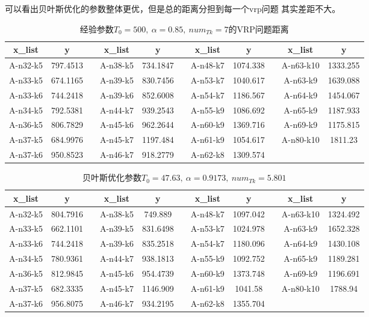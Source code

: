 \documentclass{nudt}
\begin{document}
可以看出贝叶斯优化的参数整体更优，但是总的距离分担到每一个vrp问题
其实差距不大。
\begin{table}[htbp]
	\centering
	\caption{经验参数$T_0=500,\ \alpha=0.85,\ num_{Tk}=7$的VRP问题距离}
	  \begin{tabular}{ccccccccccc}
	  \toprule
	  \textbf{x\_list} & \textbf{y} &     & \textbf{x\_list} & \textbf{y} &     & \textbf{x\_list} & \textbf{y} &     & \textbf{x\_list} & \textbf{y} \\
	  \midrule
	  A-n32-k5 & 797.4513 &     & A-n38-k5 & 734.1847 &     & A-n48-k7 & 1074.338 &     & A-n63-k10 & 1333.255 \\
	  A-n33-k5 & 674.1165 &     & A-n39-k5 & 830.7456 &     & A-n53-k7 & 1040.617 &     & A-n63-k9 & 1639.088 \\
	  A-n33-k6 & 744.2418 &     & A-n39-k6 & 852.6008 &     & A-n54-k7 & 1186.567 &     & A-n64-k9 & 1454.067 \\
	  A-n34-k5 & 792.5381 &     & A-n44-k7 & 939.2543 &     & A-n55-k9 & 1086.692 &     & A-n65-k9 & 1187.933 \\
	  A-n36-k5 & 806.7829 &     & A-n45-k6 & 962.2644 &     & A-n60-k9 & 1369.716 &     & A-n69-k9 & 1175.815 \\
	  A-n37-k5 & 684.9976 &     & A-n45-k7 & 1197.484 &     & A-n61-k9 & 1054.617 &     & A-n80-k10 & 1811.23 \\
	  A-n37-k6 & 950.8523 &     & A-n46-k7 & 918.2779 &     & A-n62-k8 & 1309.574 &     &     &  \\
	  \bottomrule
	  \end{tabular}%
	\label{tab:exp_index}%
  \end{table}%
\begin{table}[htbp]
	\centering
	\caption{贝叶斯优化参数$T_0=47.63,\ \alpha=0.9173,\ num_{Tk}=5.801$}
	  \begin{tabular}{ccccccccccc}
	  \toprule
	  \textbf{x\_list} & \textbf{y} &     & \textbf{x\_list} & \textbf{y} &     & \textbf{x\_list} & \textbf{y} &     & \textbf{x\_list} & \textbf{y} \\
	  \midrule
	  A-n32-k5 & 804.7916 &     & A-n38-k5 & 749.889 &     & A-n48-k7 & 1097.042 &     & A-n63-k10 & 1324.492 \\
	  A-n33-k5 & 662.1101 &     & A-n39-k5 & 831.6498 &     & A-n53-k7 & 1024.978 &     & A-n63-k9 & 1652.328 \\
	  A-n33-k6 & 744.2418 &     & A-n39-k6 & 835.2518 &     & A-n54-k7 & 1180.096 &     & A-n64-k9 & 1430.108 \\
	  A-n34-k5 & 780.9361 &     & A-n44-k7 & 938.1813 &     & A-n55-k9 & 1092.752 &     & A-n65-k9 & 1189.281 \\
	  A-n36-k5 & 812.9845 &     & A-n45-k6 & 954.4739 &     & A-n60-k9 & 1373.748 &     & A-n69-k9 & 1196.691 \\
	  A-n37-k5 & 682.3335 &     & A-n45-k7 & 1146.909 &     & A-n61-k9 & 1041.58 &     & A-n80-k10 & 1788.94 \\
	  A-n37-k6 & 956.8075 &     & A-n46-k7 & 934.2195 &     & A-n62-k8 & 1355.704 &     &     &  \\
	  \bottomrule
	  \end{tabular}%
	\label{tab:bayes_index}%
  \end{table}%
	
\end{document}
